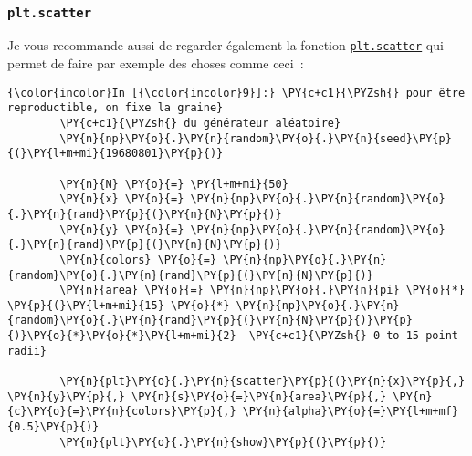     \begin{center}
    \end{center}
    { \hspace*{\fill} \\}
    
    \hypertarget{plt.scatter}{%
\subsubsection{\texorpdfstring{\texttt{plt.scatter}}{plt.scatter}}\label{plt.scatter}}

    Je vous recommande aussi de regarder également la fonction
\href{https://matplotlib.org/api/_as_gen/matplotlib.pyplot.scatter.html?highlight=matplotlib\%20pyplot\%20scatter\#matplotlib.pyplot.scatter}{\texttt{plt.scatter}}
qui permet de faire par exemple des choses comme ceci~:

    \begin{Verbatim}[commandchars=\\\{\},frame=single,framerule=0.3mm,rulecolor=\color{cellframecolor}]
{\color{incolor}In [{\color{incolor}9}]:} \PY{c+c1}{\PYZsh{} pour être reproductible, on fixe la graine}
        \PY{c+c1}{\PYZsh{} du générateur aléatoire}
        \PY{n}{np}\PY{o}{.}\PY{n}{random}\PY{o}{.}\PY{n}{seed}\PY{p}{(}\PY{l+m+mi}{19680801}\PY{p}{)}
        
        \PY{n}{N} \PY{o}{=} \PY{l+m+mi}{50}
        \PY{n}{x} \PY{o}{=} \PY{n}{np}\PY{o}{.}\PY{n}{random}\PY{o}{.}\PY{n}{rand}\PY{p}{(}\PY{n}{N}\PY{p}{)}
        \PY{n}{y} \PY{o}{=} \PY{n}{np}\PY{o}{.}\PY{n}{random}\PY{o}{.}\PY{n}{rand}\PY{p}{(}\PY{n}{N}\PY{p}{)}
        \PY{n}{colors} \PY{o}{=} \PY{n}{np}\PY{o}{.}\PY{n}{random}\PY{o}{.}\PY{n}{rand}\PY{p}{(}\PY{n}{N}\PY{p}{)}
        \PY{n}{area} \PY{o}{=} \PY{n}{np}\PY{o}{.}\PY{n}{pi} \PY{o}{*} \PY{p}{(}\PY{l+m+mi}{15} \PY{o}{*} \PY{n}{np}\PY{o}{.}\PY{n}{random}\PY{o}{.}\PY{n}{rand}\PY{p}{(}\PY{n}{N}\PY{p}{)}\PY{p}{)}\PY{o}{*}\PY{o}{*}\PY{l+m+mi}{2}  \PY{c+c1}{\PYZsh{} 0 to 15 point radii}
        
        \PY{n}{plt}\PY{o}{.}\PY{n}{scatter}\PY{p}{(}\PY{n}{x}\PY{p}{,} \PY{n}{y}\PY{p}{,} \PY{n}{s}\PY{o}{=}\PY{n}{area}\PY{p}{,} \PY{n}{c}\PY{o}{=}\PY{n}{colors}\PY{p}{,} \PY{n}{alpha}\PY{o}{=}\PY{l+m+mf}{0.5}\PY{p}{)}
        \PY{n}{plt}\PY{o}{.}\PY{n}{show}\PY{p}{(}\PY{p}{)}
\end{Verbatim}


